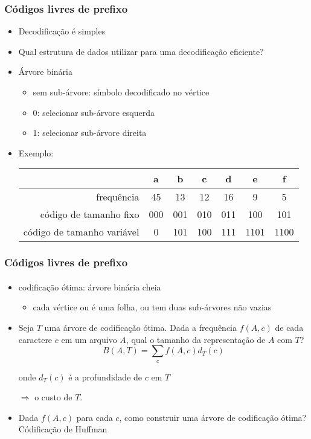 \documentclass{beamer}
\begin{document}

\begin{frame}
\frametitle{Códigos livres de prefixo}

\begin{itemize}
\item Decodificação é simples
\item Qual estrutura de dados utilizar para uma decodificação eficiente?
\pause
\item Árvore binária
\begin{itemize}
\item sem sub-árvore: símbolo decodificado no vértice
\item 0: selecionar sub-árvore esquerda
\item 1: selecionar sub-árvore direita
\end{itemize}
\item Exemplo:
\begin{center}
\begin{tabular}{r|c|c|c|c|c|c|}
& a & b & c & d & e & f \\
\hline
frequência & 45 & 13 & 12 & 16 & 9 & 5 \\
código de tamanho fixo & 000 & 001 & 010 & 011 & 100 & 101 \\
código de tamanho variável & 0 & 101 & 100 & 111 & 1101 & 1100
\end{tabular}
\end{center}
\end{itemize}
\end{frame}


\begin{frame}
\frametitle{Códigos livres de prefixo}
\framesubtitle{}
\begin{itemize}
\item codificação ótima: árvore binária cheia
\begin{itemize}
\item cada vértice ou é uma folha, ou tem duas sub-árvores não vazias
\end{itemize}
\item Seja $T$ uma árvore de codificação ótima. Dada a frequência $f(A, c)$ de cada
  caractere $c$ em um arquivo $A$, qual o tamanho da representação de $A$ com
  $T$?  \pause
$$ B(A, T) = \sum_{c} f(A, c) d_T(c)$$

  onde $d_T(c)$ é a profundidade de $c$ em $T$

  $\Longrightarrow$ o \alert{custo} de $T$.
\pause
\item Dada $f(A, c)$ para cada $c$, como construir uma árvore de codificação ótima? \pause \alert{Códificação de Huffman}

\end{itemize}
\end{frame}
\end{document}
